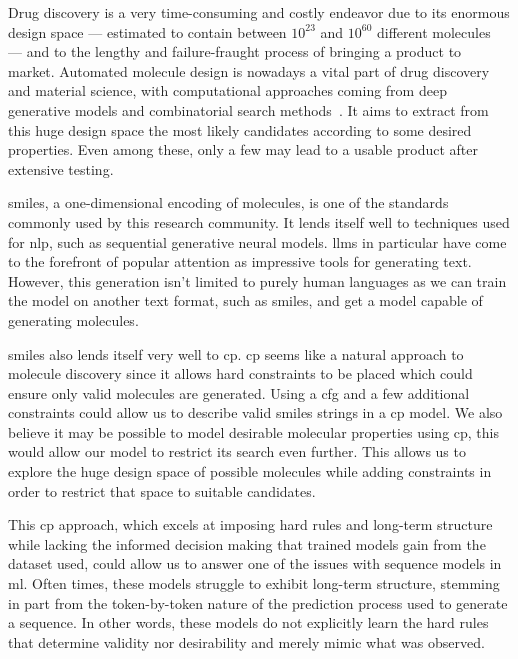 \documentclass[../Document.tex]{subfiles}
\begin{document}
\label{chap:introduction}

Drug discovery is a very time-consuming and costly endeavor due to its enormous design space
--- estimated to contain between $10^{23}$ and $10^{60}$ different molecules~\cite{molecule-space} --- and to the lengthy and failure-fraught process of bringing a product to market.
Automated molecule design is nowadays a vital part of drug discovery and material science, with computational approaches coming from deep generative models and combinatorial search methods~\cite{du2022molgensurvey}.
It aims to extract from this huge design space the most likely candidates according to some desired properties.
Even among these, only a few may lead to a usable product after extensive testing.

\gls{smiles}, a one-dimensional encoding of molecules, is one of the standards commonly used by this research community.
It lends itself well to techniques used for \gls{nlp}, such as sequential generative neural models.
\glspl{llm} in particular have come to the forefront of popular attention as impressive tools for generating text.
However, this generation isn't limited to purely human languages as we can train the model on another text format, such as \gls{smiles}, and get a model capable of generating molecules.

\gls{smiles} also lends itself very well to \gls{cp}. \gls{cp} seems like a natural approach to molecule discovery since it allows hard constraints to be placed which could ensure only valid molecules are generated.
Using a \gls{cfg} and a few additional constraints could allow us to describe valid \gls{smiles} strings in a \gls{cp} model.
We also believe it may be possible to model desirable molecular properties using \gls{cp}, this would allow our model to restrict its search even further.
This allows us to explore the huge design space of possible molecules while adding constraints in order to restrict that space to suitable candidates.

This \gls{cp} approach, which excels at imposing hard rules and long-term structure while lacking the informed decision making that trained models gain from the dataset used, could allow us to answer one of the issues with sequence models in \gls{ml}.
Often times, these models struggle to exhibit long-term structure, stemming in part from the token-by-token nature of the prediction process used to generate a sequence.
In other words, these models do not explicitly learn the hard rules that determine validity nor desirability and merely mimic what was observed.
\end{document}
